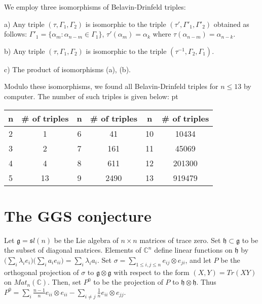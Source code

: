 \documentclass[12pt]{article}
\numberwithin{equation}{section}
\begin{document}
We employ three isomorphisms of Belavin-Drinfeld triples:

a) Any triple $(\tau, \Gamma_1, \Gamma_2)$ is isomorphic to the triple
$(\tau', \Gamma'_1, \Gamma'_2)$ obtained as follows: $\Gamma'_1 =
\{\alpha_m: \alpha_{n-m} \in \Gamma_1\}$, $\tau'(\alpha_m) = \alpha_k$
where $\tau(\alpha_{n-m}) = \alpha_{n-k}$.

b) Any triple $(\tau, \Gamma_1, \Gamma_2)$ is isomorphic to the triple
$(\tau^{-1}, \Gamma_2, \Gamma_1)$.

c) The product of isomorphisms (a), (b).

Modulo these isomorphisms, we found all Belavin-Drinfeld triples for
$n \leq 13$ by computer.  The number of such triples is given below:
 pt

\begin{center}
\begin{tabular}{|c|c||c|c||c|c|}\hline
n & \# of triples & n & \# of triples & n & \# of triples \\ \hline
2 & 1 & 6 & 41 & 10 & 10434 \\ \hline
3 & 2 & 7 & 161 & 11 & 45069 \\ \hline
4 & 4 & 8 & 611 & 12 & 201300 \\ \hline
5 & 13 & 9 & 2490 & 13 & 919479 \\ 
\hline
\end{tabular}
\end{center}

\section{The GGS conjecture}

Let $\mathfrak g = {\mathfrak sl}(n)$ be the Lie algebra of $n \times
n$ matrices of trace zero. Set $\mathfrak h \subset \mathfrak g$ to be
the subset of diagonal matrices.  Elements of $\mathbb C^n$ define
linear functions on $\mathfrak h$ by $\bigl( \sum_i \lambda_i e_i
\bigr) \bigl( \sum_i a_i e_{ii} \bigr)= \sum_i \lambda_i a_i$.  Set
$\sigma = \sum_{1 \leq i,j \leq n} e_{ij} \otimes e_{ji}$, and let $P$
be the orthogonal projection of $\sigma$ to $\mathfrak g \otimes
\mathfrak g$ with respect to the form $(X,Y) = Tr(XY)$ on
$Mat_n(\mathbb C)$.  Then, set $P^0$ to be
the projection of $P$ to $\mathfrak h \otimes \mathfrak h$.  Thus $P^0
= \sum_i \frac{n-1}{n} e_{ii} \otimes e_{ii} - \sum_{i \neq j}
\frac{1}{n} e_{ii} \otimes e_{jj}$.
 
\end{document}
